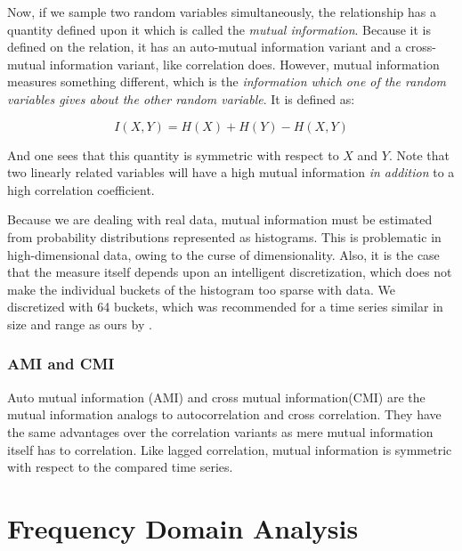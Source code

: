 \documentclass[12pt]{article}
\begin{document}
Now, if we sample two random variables simultaneously, the relationship has a quantity defined upon it which is called the \emph{mutual information}. Because it is defined on the relation, it has an auto-mutual information variant and a cross-mutual information variant, like correlation does. However, mutual information measures something different, which is the \emph{information which one of the random variables gives about the other random variable}. It is defined as:

$$I(X, Y) = H(X) + H(Y) - H(X, Y)$$

And one sees that this quantity is symmetric with respect to $X$ and $Y$. Note that two linearly related variables will have a high mutual information \emph{in addition} to a high correlation coefficient.

Because we are dealing with real data, mutual information must be estimated from probability distributions represented as histograms. This is problematic in high-dimensional data, owing to the curse of dimensionality\cite{bellman}. Also, it is the case that the measure itself depends upon an intelligent discretization, which does not make the individual buckets of the histogram too sparse with data\cite{alzheimersmi}. We discretized with 64 buckets, which was recommended for a time series similar in size and range as ours by \cite{alzheimersmi}.

\subsubsection{AMI and CMI}

Auto mutual information (AMI) and cross mutual information(CMI) are the mutual information analogs to autocorrelation and cross correlation. They have the same advantages over the correlation variants as mere mutual information itself has to correlation. Like lagged correlation, mutual information is symmetric with respect to the compared time series.




\section{Frequency Domain Analysis}
\end{document}
